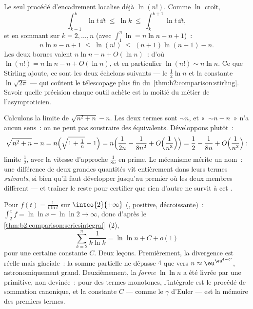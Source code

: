 \begin{example}\label{ex:b2:comparison:lnfactorial}
Le seul procédé d'encadrement localise déjà $\ln(n!)$. Comme
$\ln$ croît,
\[
\int_{k-1}^{k}\ln t\,\dd t \;\leq\; \ln k \;\leq\;
\int_{k}^{k+1}\ln t\,\dd t ,
\]
et en sommant sur $k = 2, \dots, n$ (avec $\int_1^n\ln = n\ln n
- n + 1$)~:
\[
n\ln n - n + 1 \;\leq\; \ln(n!) \;\leq\; (n+1)\ln(n+1) - n .
\]
Les deux bornes valent $n\ln n - n + O(\ln n)$~: d'où $\ln(n!) = n\ln
n - n + O(\ln n)$, et en particulier $\ln(n!) \sim n\ln n$.
Ce que Stirling ajoute, ce sont les deux échelons suivants --- le
$\frac12\ln n$ et la constante $\ln\sqrt{2\pi}$ --- qui coûtent le
télescopage plus fin du~\cref{thm:b2:comparison:stirling}. Savoir
quelle précision chaque outil achète est la moitié du métier de
l'asymptoticien.
\end{example}

\begin{example}\label{ex:b2:comparison:cancellation}
Calculons la limite de $\sqrt{n^2 + n} - n$. Les deux termes sont
$\sim n$, et «~$\sim n - n$~» n'a aucun sens~: on ne peut pas
soustraire des équivalents. Développons plutôt~:
\[
\sqrt{n^2 + n} - n
= n\Bigl(\sqrt{1 + \tfrac1n} - 1\Bigr)
= n\Bigl(\frac{1}{2n} - \frac{1}{8n^2} +
O\Bigl(\frac1{n^3}\Bigr)\Bigr)
= \frac12 - \frac{1}{8n} + O\Bigl(\frac1{n^2}\Bigr) :
\]
limite $\frac12$, avec la vitesse d'approche $\frac1{8n}$ en prime. Le
mécanisme mérite un nom~: une différence de deux grandes quantités
 vit entièrement dans leurs termes \emph{suivants}, si
bien qu'il faut développer jusqu'au premier  où les deux membres
diffèrent --- et traîner le reste pour certifier que rien d'autre ne
survit à cet .
\end{example}

\begin{example}\label{ex:b2:comparison:loglog}
Pour $f(t) = \frac{1}{t\ln t}$ sur $\intco{2}{+\infty}$
(, positive, décroissante)~: $\int_2^x f = \ln\ln x -
\ln\ln 2 \to \infty$, donc d'après le~%
\cref{thm:b2:comparison:seriesintegral}~(2),
\[
\sum_{k=2}^{n}\frac{1}{k\ln k} = \ln\ln n + C + o(1)
\]
pour une certaine constante $C$. Deux leçons. Premièrement, la
divergence est réelle mais glaciale~: la somme partielle ne dépasse
$4$ que vers $n \approx \eu^{\eu^{4 - C}}$, astronomiquement grand.
Deuxièmement, la \emph{forme} $\ln\ln n$ a été livrée par une
primitive, non devinée~: pour des termes monotones, l'intégrale est le
procédé de sommation canonique, et la constante $C$ --- comme le
$\gamma$ d'Euler --- est la mémoire des premiers termes.
\end{example}


